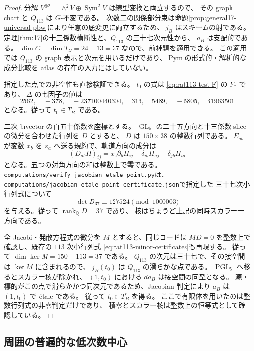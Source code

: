\begin{proof}
分解 $V^{\otimes2}=\wedge^2V\oplus\operatorname{Sym}^2V$ は線型変換と両立するので、
その graph chart と $Q_{113}$ は $G$-不変である。
次数二の関係部分束は命題\ref{prop:general17-universal-pbw}により任意の底変更に両立するため、
$j_B$ はスキームの射である。
定理\ref{thm:17}の十三係数横断性と、$Q_{113}$ の三十七次元性から、
$a_B$ は支配的である。
$\dim G+\dim T_B=24+13=37$ なので、前補題を適用できる。
この適用では $Q_{113}$ の graph 表示と次元を用いるだけであり、
Pym の形式的・解析的な成分比較を atlas の存在の入力にはしていない。

指定した点での非空性も直接検証できる。
$t_0$ の式は \eqref{eq:rat113-test-F} の $F_*$ であり、
$\Delta$ の七因子の値は
\[
2562,\quad-378,\quad-237100440304,\quad316,\quad5489,\quad-5805,\quad31963501
\]
となる。従って $t_0\in T_B$ である。

二次 bivector の百五十係数を座標とする。
$\operatorname{GL}_5$ の二十五方向と十三係数 slice の微分を合わせた行列を $D$ とすると、
$D$ は $150\times38$ の整数行列である。
$E_{ab}$ が変数 $x_b$ を $x_a$ へ送る規約で、軌道方向の成分は
\[
 (D_{ab}\Pi)_{ij}
 =x_a\partial_b\Pi_{ij}
  -\delta_{ib}\Pi_{aj}-\delta_{jb}\Pi_{ia}
\]
となる。五つの対角方向の和は整数上で零である。
\nolinkurl{computations/verify_jacobian_etale_point.py}は、
\nolinkurl{computations/jacobian_etale_point_certificate.json}で指定した
三十七次小行列式について
\[
 \det D_{37}\equiv127524\pmod{1000003}
\]
を与える。従って $\operatorname{rank}_{\mathbb Q}D=37$ であり、
核はちょうど上記の同時スカラー一方向である。

全 Jacobi・発散方程式の微分を $M$ とすると、同じコードは
$M D=0$ を整数上で確認し、既存の $113$ 次小行列式
\eqref{eq:rat113-minor-certificates}も再現する。
従って $\dim\ker M=150-113=37$ である。
$Q_{113}$ の次元は三十七で、その接空間は $\ker M$ に含まれるので、
$j_B(t_0)$ は $Q_{113}$ の滑らかな点である。
$\operatorname{PGL}_5$ へ移るとスカラー核が除かれ、
$(1,t_0)$ における $d a_B$ は接空間の同型となる。
源・標的がこの点で滑らかかつ同次元であるため、Jacobian 判定により
$a_B$ は $(1,t_0)$ で étale である。
従って $t_0\in T_B^e$ を得る。
ここで有限体を用いたのは整数行列式の非零判定だけであり、
積零とスカラー核は整数上の恒等式として確認している。
\end{proof}

\subsection{周囲の普遍的な低次数中心}

